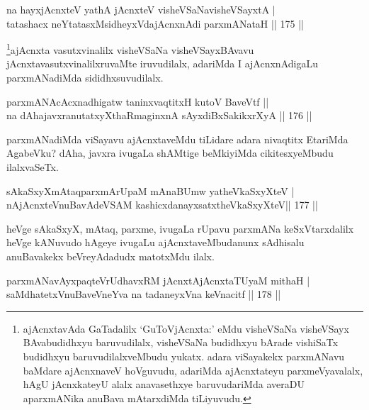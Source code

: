 \begin{shl}
na hayxjAcnxteV yathA jAcnxteV visheVSaNavisheVSayxtA | \\
tatashacx neYtatasxMsidheyxVdajAcnxnAdi parxmANataH \hfill||  175 ||  
\end{shl}

\begin{artha}
\footnote{ajAcnxtavAda GaTadalilx `GuToVjAcnxta:' eMdu visheVSaNa visheVSayx BAvabudidhxyu baruvudilalx, visheVSaNa budidhxyu bArade vishiSaTx budidhxyu baruvudilalxveMbudu yukatx. adara viSayakekx parxmANavu baMdare ajAcnxnaveV hoVguvudu, adariMda ajAcnxtateyu parxmeVyavalalx, hAgU jAcnxkateyU alalx anavasethxye baruvudariMda averaDU aparxmANika anuBava mAtarxdiMda tiLiyuvudu.}ajAcnxta vasutxvinalilx visheVSaNa visheVSayxBAvavu jAcnxtavasutxvinalilxruvaMte iruvudilalx, adariMda I ajAcnxnAdigaLu parxmANadiMda sididhxsuvudilalx.
\end{artha}


\begin{shl}
parxmANAcAcxnadhigatw taninxvaqtitxH kutoV BaveVtf ||  \\
na dAhajavxranutatxyXthaRmaginxnA sAyxdiBxSakikxrXyA \hfill||  176 ||  
\end{shl}

\begin{artha}
parxmANadiMda viSayavu ajAcnxtaveMdu tiLidare adara nivaqtitx EtariMda AgabeVku? dAha, javxra ivugaLa shAMtige beMkiyiMda cikitesxyeMbudu ilalxvaSeTx.
\end{artha}

\begin{shl}
sAkaSxyXmAtaqparxmArUpaM mAnaBUmw yatheVkaSxyXteV | \\
nAjAcnxteV\s nuBavAdeVSAM kashicxdanayxsatxtheVkaSxyXteV\hfill ||  177 ||  
\end{shl}

\begin{artha}
heVge sAkaSxyX, mAtaq, parxme, ivugaLa rUpavu parxmANa keSxVtarxdalilx heVge kANuvudo hAgeye ivugaLu ajAcnxtaveMbudanunx sAdhisalu anuBavakekx beVreyAdadudx matotxMdu ilalx.
\end{artha}

\begin{shl}
parxmANavAyxpaqteVrUdhavxRM jAcnxtAjAcnxtaTUyaM mithaH | \\
saMdhatetxV\s nuBaveVneYva na tadaneyxVna keVnacitf \hfill||  178 ||  
\end{shl}

